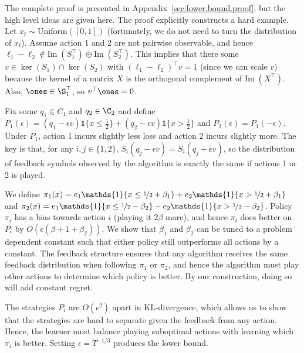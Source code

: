\documentclass{article}
\newcommand{\im}{{\mathrm{Im}\;}}
\begin{document}
The complete proof is presented in Appendix~\ref{sec:lower.bound.proof}, but the high level ideas are given here. The proof explicitly constructs a hard example. Let $x_t\sim\mathrm{Uniform}([0,1])$ (fortunately, we do not need to turn the distribution of $x_t$). Assume action 1 and 2 are not pairwise observable, and hence $\ell_1 -\ell_2\notin\im(S_1^\top)\oplus\im(S_2^\top)$. This implies that there some $v\in\ker(S_1)\cap\ker(S_2)$ with $(\ell_1-\ell_2)^\top v = 1$ (since we can scale $v$) because the kernel of a matrix $X$ is the orthogonal complement of $\im(X^\top)$. Also, $\ones\in\S_1^\top$, so $v^\top \ones = 0$. 

Fix some $q_1\in C_1$ and $q_2\in\C_2$ and define $P_1(\epsilon) = (q_1 - \epsilon v)\mathds{1}\{x\leq \frac12\} + (q_2 - \epsilon v)\mathds{1}\{x >\frac12\}$ and $P_2(\epsilon)=P_1(-\epsilon)$. Under $P_1$, action 1 incurs slightly less loss and action 2 incurs slightly more. The key is that, for any $i, j\in \{1,2\}$, $S_i (q_j - \epsilon v) = S_i(q_j + \epsilon v)$, so the distribution of feedback symbols observed by the algorithm is exactly the same if actions 1 or 2 is played.

We define $\pi_1(x) = e_1 \mathds{1}\{x\leq \nicefrac12 + \beta_1\} + e_2 \mathds{1}\{x > \nicefrac12 + \beta_1\}$ and
$\pi_2(x) = e_1 \mathds{1}\{x\leq \nicefrac12 - \beta_2\} - e_2 \mathds{1}\{x > \nicefrac12 - \beta_2\}$. Policy $\pi_i$ has a bias towards action $i$ (playing it $2\beta$ more), and hence $\pi_i$ does better on $P_i$ by $O(\epsilon(\beta+1+\beta_2))$. We show that $\beta_1$ and $\beta_2$ can be tuned to a problem dependent constant such that either policy still outperforms all actions by a constant. The feedback structure ensures that any algorithm receives the same feedback distribution when following $\pi_1$ or $\pi_2$, and hence the algorithm must play other actions to determine which policy is better. By our construction, doing so will add constant regret.

The strategies $P_i$ are $O(\epsilon^2)$ apart in KL-divergence, which allows us to show that the strategies are  hard to separate given the feedback from any action. Hence, the learner must balance playing suboptimal actions with learning which $\pi_i$ is better. Setting $\epsilon=T^{-1/3}$ produces the lower bound.


\end{document}
